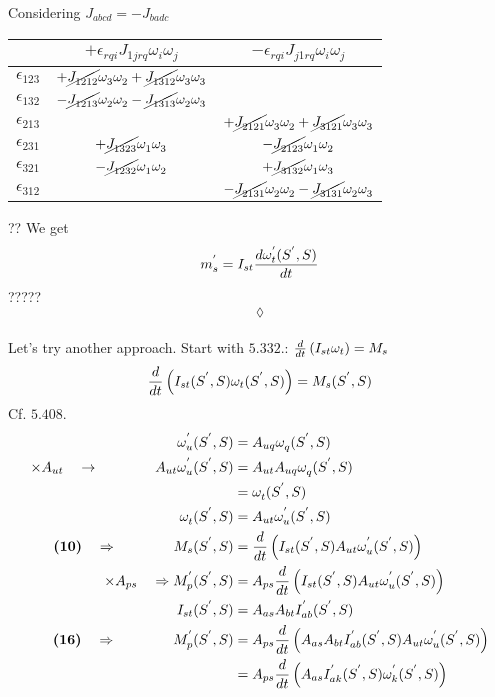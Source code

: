 Considering $J_{abcd}= -J_{badc}$
\begin{table}[H]
\centering
 \begin{tabular}{||c | | c  | c||} 
 \hline
  & $+\epsilon_{rqi}J^{}_{1jrq}\omega^{}_{i}\omega^{}_{j}$ & $-\epsilon_{rqi}J^{}_{j1rq}\omega^{}_{i}\omega^{}_{j}   $\\ [1.5ex] 
 \hline\hline
 $\epsilon_{123}$ & $+\cancel{J^{}_{1212}}\omega^{}_{3}\omega^{}_{2}+\cancel{J^{}_{1312}}\omega^{}_{3}\omega^{}_{3}$ & $ $\\  
 $\epsilon_{132}$ & $-\cancel{J^{}_{1213}}\omega^{}_{2}\omega^{}_{2}-\cancel{J^{}_{1313}}\omega^{}_{2}\omega^{}_{3}$ & $ $\\
 $\epsilon_{213}$ & $ $ & $+\cancel{J^{}_{2121}}\omega^{}_{3}\omega^{}_{2}+\cancel{J^{}_{3121}}\omega^{}_{3}\omega^{}_{3}   $\\
 $\epsilon_{231}$ & $+\cancel{J^{}_{1323}}\omega^{}_{1}\omega^{}_{3}$ & $-\cancel{J^{}_{2123}}\omega^{}_{1}\omega^{}_{2}$\\
 $\epsilon_{321}$ & $-\cancel{J^{}_{1232}}\omega^{}_{1}\omega^{}_{2}$ & $+\cancel{J^{}_{3132}}\omega^{}_{1}\omega^{}_{3}   $\\
 $\epsilon_{312}$ & $ $ & $-\cancel{J^{}_{2131}}\omega^{}_{2}\omega^{}_{2} -\cancel{J^{}_{3131}}\omega^{}_{2}\omega^{}_{3}   $\\   [1ex] 
 \hline
 \end{tabular}
\end{table}
??
We get $$ m^{'}_s = I_{st}\dv{\omega^{'}_{t}(S^{'},S)}{t}$$?????\\
$$\lozenge$$\\
\newpage
Let's try another approach. Start with $\mathbf{5.332.}$: $\dv{}{t}\left(I_{st}\omega_{t}\right)= M_s$
\begin{align}
\dv{}{t}\left(I_{st}(S^{'},S)\omega_{t}(S^{'},S)\right)= M_s(S^{'},S)
\end{align}
Cf. $\mathbf{5.408.}$
\begin{align}
\omega^{'}_{u}(S^{'},S)&=A_{uq}\omega^{}_{q}(S^{'},S)\\
\times A_{ut}\quad \rightarrow \quad\quad\quad\quad A_{ut}\omega^{'}_{u}(S^{'},S)&=A_{ut}A_{uq}\omega^{}_{q}(S^{'},S)\\
&=\omega^{}_{t}(S^{'},S)\\
\quad\quad\quad\quad \omega^{}_{t}(S^{'},S) &=  A_{ut}\omega^{'}_{u}(S^{'},S)\\
\textbf{(10)}\quad\Rightarrow\quad\quad\quad\quad M_s(S^{'},S) &=\dv{}{t}\left(I_{st}(S^{'},S)A_{ut}\omega^{'}_{u}(S^{'},S)\right)\\
\times A_{ps}\quad \Rightarrow M^{'}_p(S^{'},S) &=A_{ps}\dv{}{t}\left(I_{st}(S^{'},S)A_{ut}\omega^{'}_{u}(S^{'},S)\right)\\
I_{st}(S^{'},S)&= A_{as}A_{bt}I^{'}_{ab}(S^{'},S)\\
\textbf{(16)}\quad\Rightarrow \quad\quad\quad\quad M^{'}_p(S^{'},S) &=A_{ps}\dv{}{t}\left(A_{as}A_{bt}I^{'}_{ab}(S^{'},S)A_{ut}\omega^{'}_{u}(S^{'},S)\right)\\
&=A_{ps}\dv{}{t}\left(A_{as}I^{'}_{ak}(S^{'},S)\omega^{'}_{k}(S^{'},S)\right)
\end{align}
